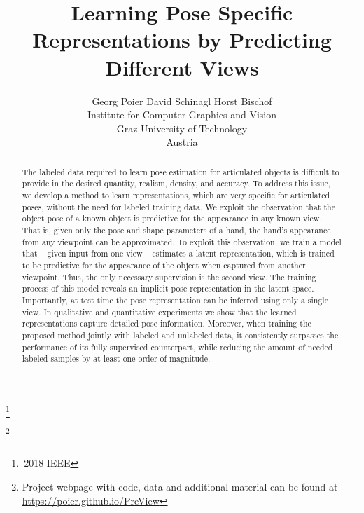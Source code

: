 \documentclass[10pt,twocolumn,letterpaper]{article}
\newcommand\blfootnote[1]{%
  \begingroup
  \renewcommand\thefootnote{}\footnote{#1}%
  \addtocounter{footnote}{-1}%
  \endgroup
}
\begin{document}
\title{Learning Pose Specific Representations by Predicting Different Views}

\author{Georg Poier \hspace{3em} David Schinagl \hspace{3em} Horst Bischof\\
Institute for Computer Graphics and Vision\\
Graz University of Technology\\
Austria%
}

\maketitle

\blfootnote{\textcopyright \,2018 IEEE}	%
\blfootnote{Project webpage with code, data and additional material can be found 
at \url{https://poier.github.io/PreView}}

\begin{abstract}
The labeled data required to learn pose estimation for articulated objects 
is difficult to provide in the desired quantity, 
realism, density, and accuracy.
To address this issue, we develop a method to learn representations, 
which are very specific for articulated poses, without the need for labeled training data.
We exploit the observation that the object pose of a known object
is predictive for the appearance in any known view.
That is, given only the pose and shape parameters of a hand, 
the hand's appearance from any viewpoint can be approximated.
To exploit this observation, we train a model that -- given input from one view -- 
estimates a latent representation, which is trained to be predictive
for the appearance of the object when captured from another viewpoint.
Thus, the only necessary supervision is the second view.
The training process of this model reveals an implicit pose representation in the 
latent space.
Importantly, at test time the pose representation can be inferred using only a single view.
In qualitative and quantitative experiments we show that the learned representations
capture detailed pose information.
Moreover, when training the proposed method jointly with labeled and unlabeled data, 
it consistently surpasses the performance of its fully supervised counterpart,
while reducing the amount of needed labeled samples by at least one order of magnitude.


\end{abstract}
\end{document}
